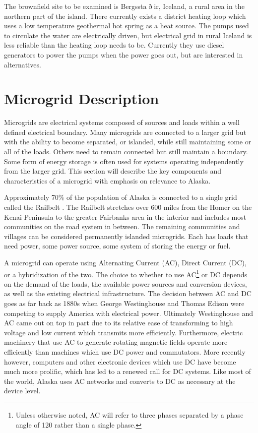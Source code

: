 The brownfield site to be examined is Bergssta$\eth$ir, Iceland, a rural area in the northern part of the island. There currently exists a district heating loop which uses a low temperature geothermal hot spring as a heat source. The pumps used to circulate the water are electrically driven, but electrical grid in rural Iceland is less reliable than the heating loop needs to be. Currently they use diesel generators to power the pumps when the power goes out, but are interested in alternatives.

\section{Microgrid Description}
Microgrids are electrical systems composed of sources and loads within a well defined electrical boundary. Many microgrids are connected to a larger grid but with the ability to become separated, or islanded, while still maintaining some or all of the loads. Others need to remain connected but still maintain a boundary. Some form of energy storage is often used for systems operating independently from the larger grid. This section will describe the key components and characteristics of a microgrid with emphasis on relevance to Alaska.

Approximately 70\% of the population of Alaska is connected to a single grid called the Railbelt \cite{railbelt}. The Railbelt stretches over 600 miles from the Homer on the Kenai Peninsula to the greater Fairbanks area in the interior and includes most communities on the road system in between. The remaining communities and villages can be considered permanently islanded microgrids. Each has loads that need power, some power source, some system of storing the energy or fuel.

A microgrid can operate using Alternating Current (AC), Direct Current (DC), or a hybridization of the two. The choice to whether to use AC\footnote{Unless otherwise noted, AC will refer to three phases separated by a phase angle of 120\textdegree{} rather than a single phase.} or DC depends on the demand of the loads, the available power sources and conversion devices, as well as the existing electrical infrastructure. The decision between AC and DC goes as far back as 1880s when George Westinghouse and Thomas Edison were competing to supply America with electrical power. Ultimately Westinghouse and AC came out on top in part due to its relative ease of transforming to high voltage and low current which transmits more efficiently. Furthermore, electric machinery that use AC to generate rotating magnetic fields operate more efficiently than machines which use DC power and commutators. More recently however, computers and other electronic devices which use DC have become much more prolific, which has led to a renewed call for DC systems. Like most of the world, Alaska uses AC networks and converts to DC as necessary at the device level.

